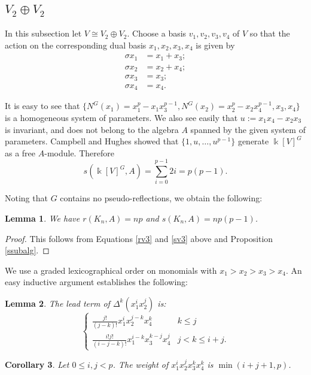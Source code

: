 \documentclass[a4paper]{amsart}
\newcommand{\kk}{\Bbbk}
\newtheorem{Lemma}{Lemma}
\newtheorem{Corollary}[Lemma]{Corollary}
\newtheorem*{Corollary of Conjecture}{Corollary of Conjecture}
\theoremstyle{definition}
\theoremstyle{remark}
\theoremstyle{Acknowledgments}
\begin{document}
\subsection{$V_2 \oplus V_2$}

In this subsection let $V \cong V_2 \oplus V_2$. Choose a basis $v_1,v_2,v_3,v_4$ of $V$ so that the action on the corresponding dual basis $x_1,x_2,x_3,x_4$ is given by
\begin{align*}
\sigma  x_1 &= x_1+x_3;\\
\sigma  x_2 &= x_2+x_4;\\
\sigma  x_3 &= x_3;\\
\sigma  x_4 &= x_4.
\end{align*}

It is easy to see that $\{N^G(x_1) = x_1^p-x_1x_3^{p-1}, N^G(x_2) = x_2^p-x_2x_4^{p-1},x_3,x_4\}$ is a homogeneous system of parameters. We also see easily that $u:=x_1x_4-x_2x_3$ is invariant, and does not belong to the algebra $A$ spanned by the given system of parameters. Campbell and Hughes \cite[Proposition~2.1]{CampbellHughes} showed that  $\{1,u, \ldots, u^{p-1}\}$ generate $\kk[V]^G$ as a free $A$-module. Therefore
\begin{equation}\label{sv3} s(\kk[V]^G,A) = \sum_{i=0}^{p-1}2i = p(p-1).\end{equation}

Noting that $G$ contains no pseudo-reflections, we obtain the following:
\begin{Lemma} We have $r(K_n,A) = np$ and $s(K_n,A) = np(p-1)$.
\end{Lemma}
\begin{proof} This follows from Equations \eqref{rv3} and \eqref{sv3} above and Proposition \ref{ssubalg}.
\end{proof}

We use a graded lexicographical order on monomials with $x_1>x_2>x_3>x_4$. An easy inductive argument establishes the following:

\begin{Lemma}\label{v2v2leadterms}
The lead term of $\Delta^k(x_1^ix_2^j)$ is:
\[\left\{ \begin{array}{lr} \frac{j!}{(j-k)!}x_1^i x_2^{j-k} x_4^k & k \leq j \\ \frac{i! j!}{(i-j-k)!}x_1^{i-k}x_3^{k-j}x_4^j & j<k \leq i+j. \end{array} \right.\]
\end{Lemma}

\begin{Corollary} Let $0 \leq i,j<p$. The weight of $x_1^ix_2^jx_3^kx_4^k$ is $\min(i+j+1,p)$.
\end{Corollary}
\end{document}
